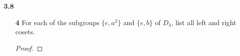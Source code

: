 \documentclass[paper=usletter, fontsize=12pt]{article}
\begin{document}
\begin{itemize}
\begin{enumerate}
\begin{proof}
            \end{proof}

            \item[\textbf{18}] Let the dihedral group $D_n$ be given by
            elements $a$ of order $n$ and $b$ of order 2, where $ba=a^{-1}b$.
            Show that any subgroup of $\langle a\rangle$ is normal in $D_n$.
            \begin{proof}

                Let $H$ be a subgroup of $\langle a\rangle$, such that any
                elements of the form $(a^m)^d\in H$\\
                Also, since $ba=a^{-1}b\in D_n$,
                \begin{align*}
                    ba^2 & = a^{-1}ba \\
                    & = a^{-1}a^{-1}b \\
                    & = a^{-2}b
                \end{align*}
                Thus, $ba^i=a^{-i}b$ for any $i$

            \end{proof}

        \end{enumerate}

        \item[\textbf{3.8}]
        \begin{enumerate}

            \item[\textbf{4}] For each of the subgroups $\{e, a^2\}$ and
            $\{e,b\}$ of $D_4$, list all left and right cosets.
            \begin{proof}


\end{proof}
\end{enumerate}
\end{itemize}
\end{document}
